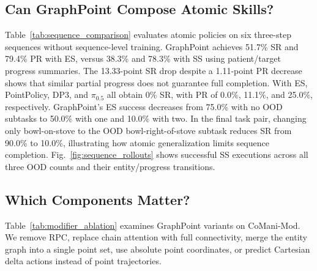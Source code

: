 \subsection{Can GraphPoint Compose Atomic Skills?}
Table~\ref{tab:sequence_comparison} evaluates atomic policies on six three-step sequences without sequence-level training.
GraphPoint achieves 51.7\% SR and 79.4\% PR with ES, versus 38.3\% and 78.3\% with SS using patient/target progress summaries.
The 13.33-point SR drop despite a 1.11-point PR decrease shows that similar partial progress does not guarantee full completion.
With ES, PointPolicy, DP3, and $\pi_{0.5}$ all obtain 0\% SR, with PR of 0.0\%, 11.1\%, and 25.0\%, respectively.
GraphPoint's ES success decreases from 75.0\% with no OOD subtasks to 50.0\% with one and 10.0\% with two.
In the final task pair, changing only bowl-on-stove to the OOD bowl-right-of-stove subtask reduces SR from 90.0\% to 10.0\%, illustrating how atomic generalization limits sequence completion.
Fig.~\ref{fig:sequence_rollouts} shows successful SS executions across all three OOD counts and their entity/progress transitions.


\subsection{Which Components Matter?}
Table~\ref{tab:modifier_ablation} examines GraphPoint variants on CoMani-Mod.
We remove RPC, replace chain attention with full connectivity, merge the entity graph into a single point set, use absolute point coordinates, or predict Cartesian delta actions instead of point trajectories.

